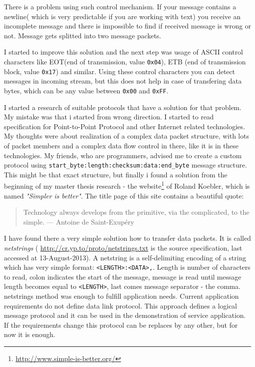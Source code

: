There is a problem using such control mechanism. If your message contains a 
newline( which is very predictable if you are working with text) you receive an
incomplete message and there is impossible to find if received message is wrong
or not. Message gets splitted into two message packets.

I started to improve this solution and the next step was usage of ASCII control
characters like EOT(end of transmission, value \texttt{0x04}), ETB (end of
transmission block, value \texttt{0x17}) and similar. Using these  control
characters you can detect messages in incoming stream, but this does not help in case of transfering data
bytes, which can be any value between \texttt{0x00} and \texttt{0xFF}.


I started a research of suitable protocols that have a solution for that problem.
My mistake was that i started from wrong direction.
I started to read
specification for Point-to-Point Protocol and other Internet related
technologies.
My thoughts were about realization of a complex data packet structure, with lots
of packet members and a complex data flow control in there, like it is in these
technologies. My friends, who are programmers, advised me to create a custom
protocol using \texttt{\mbox{start\_byte:length:checksum:data:end\_byte}} message
structure. This might be that exact structure, but finally i found a solution
from the beginning of my master thesis research - the
website\footnote{\url{http://www.simple-is-better.org/}} of Roland Koebler, which is named \textit{"Simpler is better"}.
The title page of this site contains a beautiful quote:
\begin{quotation} 
Technology always develops from the primitive, via the complicated, to the
simple. \newline
— Antoine de Saint-Exupéry
\end{quotation}

I have found there a very simple solution how to transfer data packets. It is
called \textit{netstrings} ( \url{http://cr.yp.to/proto/netstrings.txt} is the
source specification, last accessed at 13-August-2013). 
A netstring is a self-delimiting encoding of a string
which has very simple format: \texttt{<LENGTH>:<DATA>,}. Length is number of
characters to read, colon indicates the start of the message, message is read
until message length becomes equal to \texttt{<LENGTH>}, last comes message
separator - the comma.
\label{sec:netstrings}
netstrings method was enough to fulfill application needs. 
Current application requirements do not define data link protocol.
This approach defines  a logical message protocol and it can be used in the
demonstration of service application. If the requirements change this protocol
can be replaces by any other, but for now it is enough.


